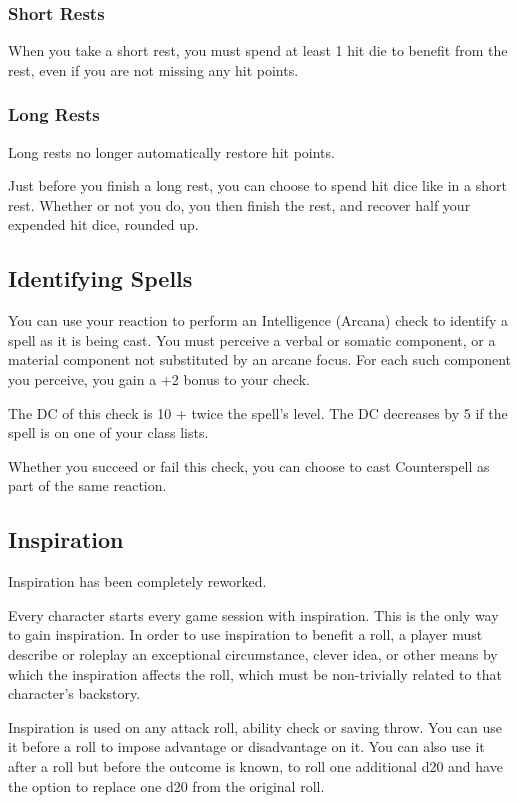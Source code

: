 \documentclass[letterpaper,twocolumn,openany,nodeprecatedcode]{dndbook}
\begin{document}
\subsubsection{Short Rests}
When you take a short rest, you must spend at least 1 hit die to benefit from the rest, even if you are not missing any hit points.

\subsubsection{Long Rests}
Long rests no longer automatically restore hit points.

Just before you finish a long rest, you can choose to spend hit dice like in a short rest. Whether or not you do, you then finish the rest, and recover half your expended hit dice, rounded up.

\subsection{Identifying Spells}
You can use your reaction to perform an Intelligence (Arcana) check to identify a spell as it is being cast. You must perceive a verbal or somatic component, or a material component not substituted by an arcane focus. For each such component you perceive, you gain a +2 bonus to your check.

The DC of this check is 10 + twice the spell's level. The DC decreases by 5 if the spell is on one of your class lists. 

Whether you succeed or fail this check, you can choose to cast Counterspell as part of the same reaction.

\subsection{Inspiration}
Inspiration has been completely reworked.

Every character starts every game session with inspiration. This is the only way to gain inspiration. In order to use inspiration to benefit a roll, a player must describe or roleplay an exceptional circumstance, clever idea, or other means by which the inspiration affects the roll, which must be non-trivially related to that character's backstory.

Inspiration is used on any attack roll, ability check or saving throw. You can use it before a roll to impose advantage or disadvantage on it. You can also use it after a roll but before the outcome is known, to roll one additional d20 and have the option to replace one d20 from the original roll. 
\end{document}
